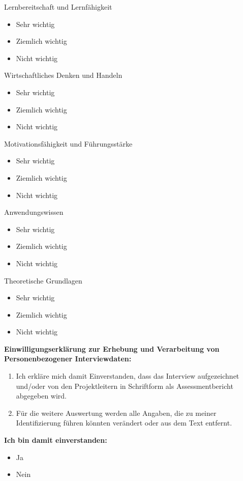 \documentclass{article}
\begin{document}
Lernbereitschaft und Lernfähigkeit

\begin{itemize}[label={\Square}] 
\item Sehr wichtig
\item Ziemlich wichtig
\item Nicht wichtig
\end{itemize} 
\bigskip 

Wirtschaftliches Denken und Handeln

\begin{itemize}[label={\Square}] 
\item Sehr wichtig
\item Ziemlich wichtig
\item Nicht wichtig
\end{itemize} 
\bigskip 

Motivationsfähigkeit und Führungsstärke

\begin{itemize}[label={\Square}] 
\item Sehr wichtig
\item Ziemlich wichtig
\item Nicht wichtig
\end{itemize} 
\bigskip 

Anwendungswissen

\begin{itemize}[label={\Square}] 
\item Sehr wichtig
\item Ziemlich wichtig
\item Nicht wichtig
\end{itemize} 
\bigskip 

Theoretische Grundlagen

\begin{itemize}[label={\Square}] 
\item Sehr wichtig
\item Ziemlich wichtig
\item Nicht wichtig
\end{itemize} 
\bigskip 

\textbf{Einwilligungserklärung zur Erhebung und Verarbeitung von Personenbezogener Interviewdaten:}

\begin{enumerate}
\item Ich erkläre mich damit Einverstanden, dass das Interview aufgezeichnet und/oder von den Projektleitern in Schriftform als Assessmentbericht abgegeben wird.   
\item Für die weitere Auswertung werden alle Angaben, die zu meiner Identifizierung führen könnten verändert oder aus dem Text entfernt.
\end{enumerate}

\textbf{Ich bin damit einverstanden:}

\begin{itemize}[label={\Square}] 
\item Ja
\item Nein
\end{itemize} 
\bigskip
\end{document}
